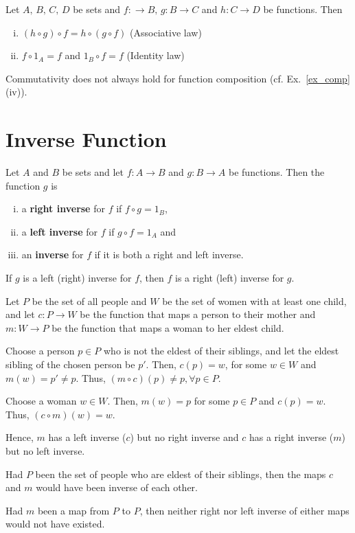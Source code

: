 \documentclass[a4paper,english,12pt]{article}
\begin{document}
\begin{lem}
Let $A,\,B,\,C,\,D$ be sets and $f:\rightarrow B,\, g:B\rightarrow C$ and $h:C\rightarrow D$ be functions. Then
\begin{enumerate}[i)]
\item $(h\circ g)\circ f=h\circ (g\circ f)$ \qquad (Associative law)
\item $f\circ 1_A=f$ and $1_B\circ f=f$ \qquad (Identity law)
\end{enumerate}
\end{lem}

\noindent Commutativity does not always hold for function composition (cf. Ex.~\ref{ex_comp}(iv)).

\section{Inverse Function}
\begin{defn}
Let $A$ and $B$ be sets and let $f:A\rightarrow  B$ and $g:B\rightarrow  A$ be functions. Then the function $g$ is 
\begin{enumerate}[i)]
\item a \textbf{right inverse} for $f$ if $f\circ g=1_B$,
\item a \textbf{left inverse} for $f$ if $g\circ f=1_A$ and
\item an \textbf{inverse} for $f$ if it is both a right and left inverse.
\end{enumerate}
\end{defn}
\noindent If $g$ is a left (right) inverse for $f$, then $f$ is a right (left) inverse for $g$.

\begin{exmp}
Let $P$ be the set of all people and $W$ be the set of women with at least one child, and let $c:P\rightarrow W$ be the function that maps a person to their mother and $m:W\rightarrow P$ be the function that maps a woman to her eldest child. 

Choose a person $p\in P$ who is not the eldest of their siblings, and let the eldest sibling of the chosen person be $p'$. Then, $c(p)=w$, for some $w\in W$ and $m(w)=p'\neq p$. Thus, $(m\circ c)(p)\neq p, \forall p\in P$.

Choose a woman $w\in W$. Then, $m(w)=p$ for some $p\in P$ and $c(p)=w$. Thus, $(c\circ m)(w)=w$.

Hence, $m$ has a left inverse ($c$) but no right inverse and $c$ has a right inverse ($m$) but no left inverse.

Had $P$ been the set of people who are eldest of their siblings, then the maps $c$ and $m$ would have been inverse of each other.

Had $m$ been a map from $P$ to $P$, then neither right nor left inverse of either maps would not have existed.
\end{exmp}
\end{document}
